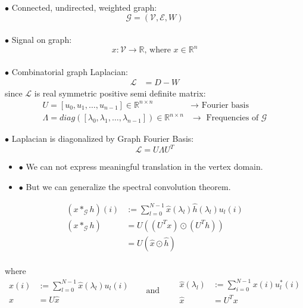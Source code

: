 \documentclass[8pt]{beamer}
\begin{document}
\begin{frame}
$\bullet$ Connected, undirected, weighted graph:
$$\mathcal{G} = (\mathcal{V}, \mathcal{E}, W) $$ \\
$\bullet$ Signal on graph:
$$x: \mathcal{V} \rightarrow \mathbb{R} \text{, where } x \in \mathbb{R}^{n}$$\\

$\bullet$ Combinatorial graph Laplacian:
  \begin{align*}
   \mathcal{L}  &= D - W 
  \end{align*} 
  since $\mathcal{L}$ is real symmetric positive semi definite matrix:
  \begin{align*}
   U = [u_0, u_1, \ldots, u_{n-1}] \in \mathbb{R}^{n \times n} &\rightarrow \text{ Fourier basis}\\
   \Lambda = diag([\lambda_0, \lambda_1, \ldots, \lambda_{n-1}]) \in \mathbb{R}^{n \times n} &\rightarrow \text{ Frequencies of $\mathcal{G}$}
  \end{align*}

 $\bullet$ Laplacian is diagonalized by Graph Fourier Basis:
  \begin{equation*}
  	\mathcal{L} = U \Lambda U^{T}
  \end{equation*} 
\end{frame}


\begin{frame}

\begin{itemize}
		\item[] $\bullet$ We can not express meaningful translation in the vertex domain.
		\item[] $\bullet$ But we can generalize the spectral convolution theorem.
\end{itemize}
\vspace{-10pt}
\begin{align*}
	(x *_\mathcal{G} h)(i) &:= \sum_{l=0}^{N-1} \hat{x}(\lambda_l)\hat{h}(\lambda_l)u_l(i) \\
	 (x *_\mathcal{G} h)   &= U( (U^{T} x)  \odot  (U^{T} h)) \\
	 					  &= U( \hat{x}  \odot  \hat{h})
\end{align*}
\vspace{-15pt}\\
where 
\begin{equation*}
  \begin{split}
	x(i) &:= \sum_{l=0}^{N-1}\hat{x}(\lambda_l)u_{l}(i) \\
	x &= U \hat{x}
  \end{split}
\text{~~~~ and ~~~~ }
  \begin{split}
	\hat{x}(\lambda_l) &:= \sum_{i=0}^{N-1}x(i)u_{l}^{*}(i) \\
	\hat{x} &= U^{T}x  
  \end{split}
\end{equation*}
\end{frame}
\end{document}
